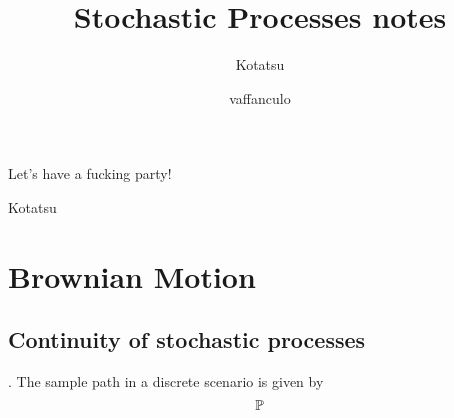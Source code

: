 \documentclass{report}
\begin{document}
	\title{Stochastic Processes notes}
	\author{Kotatsu}
	\date{\small vaffanculo}
	\maketitle
	\begin{preface}
Let's have a fucking party!
		
		\vskip1.2cm
		
		\hfill Kotatsu
	\end{preface}
\section{Brownian Motion}	
	\subsection{Continuity of stochastic processes}.
	The sample path in a discrete scenario is given by
	\begin{equation*}
		\mathbb{P}
	\end{equation*}
	\tableofcontents
\clearpage
\listoffigures  
\end{document}
